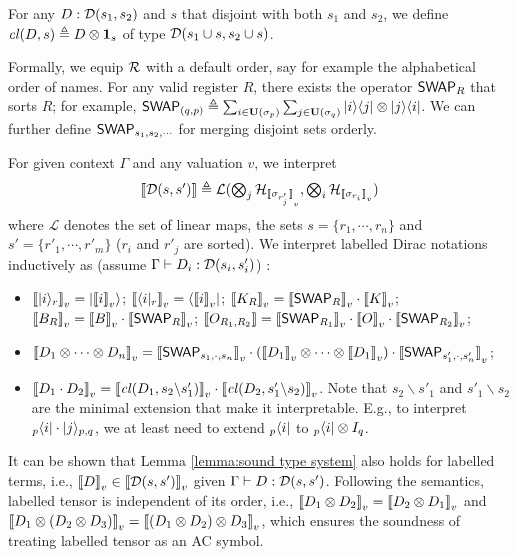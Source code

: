 \begin{definition}
  For any $D : {\mathcal{D}}(s_1,s_2)$ and $s$ that disjoint with both $s_1$ and $s_2$, we define ${\mathit{cl}}(D,s) \triangleq D\otimes \mathbf{1}_{s}$ of type ${\mathcal{D}}(s_1\cup s, s_2\cup s)$.
\end{definition}
Formally, we equip $\mathcal{R}$ with a default order, say for example the alphabetical order of names. For any valid register $R$, there exists the operator ${\mathsf{SWAP}}_R$ that sorts $R$; for example, ${\mathsf{SWAP}}_{(q,p)} \triangleq \sum_{i\in \mathbf{U}(\sigma_p)}\sum_{j\in \mathbf{U}(\sigma_q)}|i\rangle\langle j|\otimes |j\rangle\langle i|$. We can further define ${\mathsf{SWAP}}_{s_1,s_2,\cdots}$ for merging disjoint sets orderly.

For given context $\Gamma$ and any valuation $v$,
we interpret 
$$\mbox{${\llbracket {\mathcal{D}}(s,s') \rrbracket} \triangleq \mathcal{L}(\bigotimes_{j}{\mathcal{H}}_{{\llbracket \sigma_{r'_j} \rrbracket}_v}, \bigotimes_{i}{\mathcal{H}}_{{\llbracket \sigma_{r_i} \rrbracket}_v})$}$$ where $\mathcal{L}$ denotes the set of linear maps, 
the sets $s = \{r_1,\cdots,r_n\}$ and $s' = \{r'_1,\cdots,r'_m\}$ ($r_i$ and $r'_j$ are sorted).
We interpret labelled Dirac notations inductively as (assume $\Gamma\vdash D_i : {\mathcal{D}}(s_i,s'_i)$) :
\begin{itemize}
  \item ${\llbracket |i\rangle_r \rrbracket}_v = |{\llbracket i \rrbracket}_v\rangle$;\quad 
        ${\llbracket \langle i|_r \rrbracket}_v = \langle{\llbracket i \rrbracket}_v|$;\quad  
        ${\llbracket K_R \rrbracket}_v = {\llbracket {\mathsf{SWAP}}_R \rrbracket}_v \cdot {\llbracket K \rrbracket}_v$; \\
        ${\llbracket B_R \rrbracket}_v = {\llbracket B \rrbracket}_v\cdot {\llbracket {\mathsf{SWAP}}_R \rrbracket}_v$;\quad
        ${\llbracket O_{R_1,R_2} \rrbracket} = {\llbracket {\mathsf{SWAP}}_{R_1} \rrbracket}_v\cdot {\llbracket O \rrbracket}_v\cdot {\llbracket {\mathsf{SWAP}}_{R_2} \rrbracket}_v$;
  \item ${\llbracket D_1\otimes \cdots \otimes D_n \rrbracket}_v = {\llbracket {\mathsf{SWAP}}_{s_1,\cdot,s_n} \rrbracket}_v\cdot ({\llbracket D_1 \rrbracket}_v\otimes \cdots \otimes {\llbracket D_1 \rrbracket}_v)\cdot {\llbracket {\mathsf{SWAP}}_{s'_1,\cdot,s'_n} \rrbracket}_v$;
  \item ${\llbracket D_1\cdot D_2 \rrbracket}_v = {\llbracket {\mathit{cl}}(D_1, s_2\backslash s'_1) \rrbracket}_v\cdot {\llbracket {\mathit{cl}}(D_2, s'_1\backslash s_2) \rrbracket}_v$. Note that $s_2\backslash s'_1$ and $s'_1\backslash s_2$ are the minimal extension that make it interpretable. E.g., to interpret ${}_p\langle i|\cdot |j\rangle_{p,q}$, we at least need to extend ${}_p\langle i|$ to ${}_p\langle i|\otimes I_{q}$.
\end{itemize}
It can be shown that Lemma \ref{lemma:sound type system} also holds for labelled terms, i.e., ${\llbracket D \rrbracket}_v \in {\llbracket {\mathcal{D}}(s,s') \rrbracket}_v$ given $\Gamma\vdash D : {\mathcal{D}}(s,s')$. Following the semantics, labelled tensor is independent of its order, i.e., ${\llbracket D_1\otimes D_2 \rrbracket}_v = {\llbracket D_2\otimes D_1 \rrbracket}_v$ and ${\llbracket D_1\otimes (D_2\otimes D_3) \rrbracket}_v = {\llbracket (D_1\otimes D_2)\otimes D_3 \rrbracket}_v$, which ensures the soundness of treating labelled tensor as an AC symbol.

